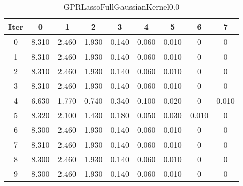 \begin{table}
	\begin{center}
		\begin{tabular}{|c|c|c|c|c|c|c|c|c|}
			\hline
			Iter & 0 & 1 & 2 & 3 & 4 & 5 & 6 & 7 \\
			\hline
			0 & 8.310 & 2.460 & 1.930 & 0.140 & 0.060 & 0.010 & 0 & 0 \\
			\hline
			1 & 8.310 & 2.460 & 1.930 & 0.140 & 0.060 & 0.010 & 0 & 0 \\
			\hline
			2 & 8.310 & 2.460 & 1.930 & 0.140 & 0.060 & 0.010 & 0 & 0 \\
			\hline
			3 & 8.310 & 2.460 & 1.930 & 0.140 & 0.060 & 0.010 & 0 & 0 \\
			\hline
			4 & 6.630 & 1.770 & 0.740 & 0.340 & 0.100 & 0.020 & 0 & 0.010 \\
			\hline
			5 & 8.320 & 2.100 & 1.430 & 0.180 & 0.050 & 0.030 & 0.010 & 0 \\
			\hline
			6 & 8.300 & 2.460 & 1.930 & 0.140 & 0.060 & 0.010 & 0 & 0 \\
			\hline
			7 & 8.310 & 2.460 & 1.930 & 0.140 & 0.060 & 0.010 & 0 & 0 \\
			\hline
			8 & 8.300 & 2.460 & 1.930 & 0.140 & 0.060 & 0.010 & 0 & 0 \\
			\hline
			9 & 8.300 & 2.460 & 1.930 & 0.140 & 0.060 & 0.010 & 0 & 0 \\
			\hline
		\end{tabular}
	\end{center}
	\caption{GPRLassoFullGaussianKernel0.0}
\end{table}